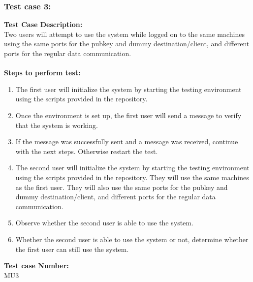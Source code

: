 \documentclass{article}
\begin{document}
\subsubsection{Test case 3: }
\textbf{Test Case Description:\\} Two users will attempt to use the system while logged on to the same machines using the same ports for the pubkey and dummy destination/client, and different ports for the regular data communication.\\\\
\textbf{Steps to perform test: } 
\begin{enumerate}
    \item The first user will initialize the system by starting the testing environment using the scripts provided in the repository.
    \item Once the environment is set up, the first user will send a message to verify that the system is working.
    \item If the message was successfully sent and a message was received, continue with the next steps. Otherwise restart the test.
    \item The second user will initialize the system by starting the testing environment using the scripts provided in the repository. They will use the same machines as the first user. They will also use the same ports for the pubkey and dummy destination/client, and different ports for the regular data communication.
    \item Observe whether the second user is able to use the system.
    \item Whether the second user is able to use the system or not, determine whether the first user can still use the system.
\end{enumerate}
\textbf{Test case Number: \\} MU3
\end{document}
